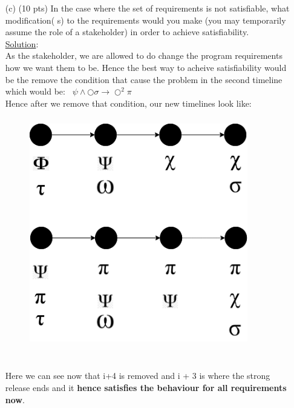 \documentclass[12pt]{article}
\begin{document}
\begin{enumerate}
\begin{itemize}
\begin{itemize}
\item[(c)] (10 pts) In the case where the set of requirements is not satisfiable, what modification(
s) to the requirements would you make (you may temporarily assume the
role of a stakeholder) in order to achieve satisfiability. \\
\noindent \underline{Solution}:\\
As the stakeholder, we are allowed to do change the program requirements how we want them to be. Hence the best way to acheive satisfiability would be the remove the condition that cause the problem in the second timeline which would be: \
$\psi \wedge \bigcirc \sigma \rightarrow \bigcirc^2 \pi $ \\
Hence after we remove that condition, our new timelines look like: \\
\begin{figure}[h!]
\centering
\includegraphics[width=0.9\textwidth, height = 10cm, keepaspectratio]{images/SOEN331_A4_Q6c.png}
\end{figure}
\\
\noindent Here we can see now that i+4 is removed and i + 3 is where the strong release ends and it \textbf{hence satisfies the behaviour for all requirements now}. \\


\end{itemize}
\end{itemize}
\end{enumerate}
\end{document}

